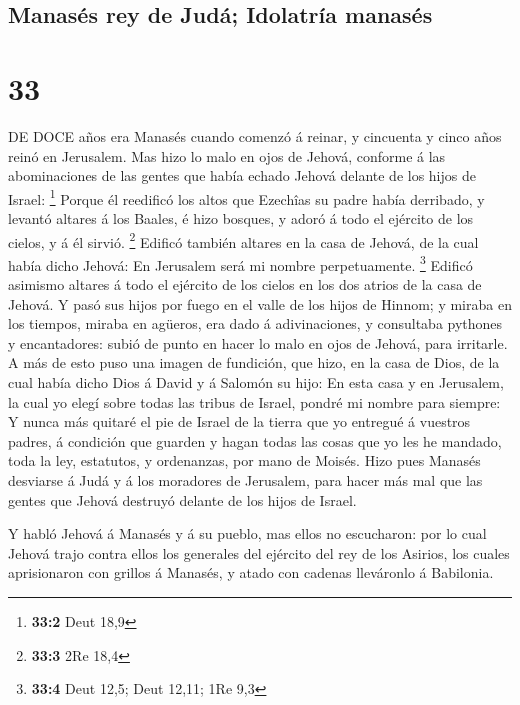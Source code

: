 \hypertarget{manasuxe9s-rey-de-juduxe1-idolatruxeda-manasuxe9s}{%
\subsection{Manasés rey de Judá; Idolatría
manasés}\label{manasuxe9s-rey-de-juduxe1-idolatruxeda-manasuxe9s}}

\hypertarget{section-32}{%
\section{33}\label{section-32}}

 DE DOCE años era Manasés cuando comenzó á reinar, y
cincuenta y cinco años reinó en Jerusalem.  Mas hizo lo malo
en ojos de Jehová, conforme á las abominaciones de las gentes que había
echado Jehová delante de los hijos de Israel: \footnote{\textbf{33:2}
  Deut 18,9}  Porque él reedificó los altos que Ezechîas su
padre había derribado, y levantó altares á los Baales, é hizo bosques, y
adoró á todo el ejército de los cielos, y á él sirvió. \footnote{\textbf{33:3}
  2Re 18,4}  Edificó también altares en la casa de Jehová,
de la cual había dicho Jehová: En Jerusalem será mi nombre
perpetuamente. \footnote{\textbf{33:4} Deut 12,5; Deut 12,11; 1Re 9,3}
 Edificó asimismo altares á todo el ejército de los cielos
en los dos atrios de la casa de Jehová.  Y pasó sus hijos
por fuego en el valle de los hijos de Hinnom; y miraba en los tiempos,
miraba en agüeros, era dado á adivinaciones, y consultaba pythones y
encantadores: subió de punto en hacer lo malo en ojos de Jehová, para
irritarle.  A más de esto puso una imagen de fundición, que
hizo, en la casa de Dios, de la cual había dicho Dios á David y á
Salomón su hijo: En esta casa y en Jerusalem, la cual yo elegí sobre
todas las tribus de Israel, pondré mi nombre para siempre: 
Y nunca más quitaré el pie de Israel de la tierra que yo entregué á
vuestros padres, á condición que guarden y hagan todas las cosas que yo
les he mandado, toda la ley, estatutos, y ordenanzas, por mano de
Moisés.  Hizo pues Manasés desviarse á Judá y á los
moradores de Jerusalem, para hacer más mal que las gentes que Jehová
destruyó delante de los hijos de Israel.

 Y habló Jehová á Manasés y á su pueblo, mas ellos no
escucharon: por lo cual Jehová trajo contra ellos los generales del
ejército del rey de los Asirios, los cuales aprisionaron con grillos á
Manasés, y atado con cadenas lleváronlo á Babilonia.

